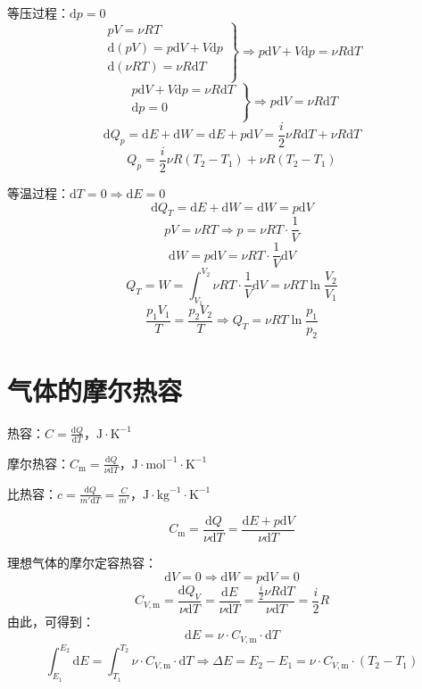 \documentclass[12pt, a4paper, twoside]{ctexbook}
\begin{document}
{\sonti 等压过程}：$\mathrm{d}p=0$
$$
\left. \begin{array}{r}
	pV=\nu RT\\
	\mathrm{d}\left( pV \right) =p\mathrm{d}V+V\mathrm{d}p\\
	\mathrm{d}\left( \nu RT \right) =\nu R\mathrm{d}T\\
\end{array} \right\} \Rightarrow p\mathrm{d}V+V\mathrm{d}p=\nu R\mathrm{d}T
$$
$$
\left. \begin{array}{r}
	p\mathrm{d}V+V\mathrm{d}p=\nu R\mathrm{d}T\\
	\mathrm{d}p=0\\
\end{array} \right\} \Rightarrow p\mathrm{d}V=\nu R\mathrm{d}T
$$
$$
\mathrm{d}Q_p=\mathrm{d}E+\mathrm{d}W=\mathrm{d}E+p\mathrm{d}V=\frac{i}{2}\nu R\mathrm{d}T + \nu R\mathrm{d}T
$$
$$
Q_p=\frac{i}{2}\nu R(T_2-T_1)+\nu R(T_2-T_1)
$$

{\sonti 等温过程}：$\mathrm{d}T=0 \Rightarrow \mathrm{d}E=0$
$$
\mathrm{d}Q_T=\mathrm{d}E+\mathrm{d}W=\mathrm{d}W=p\mathrm{d}V
$$
$$
pV=\nu RT \Rightarrow p=\nu RT\cdot \frac{1}{V}
$$
$$
\mathrm{d}W=p\mathrm{d}V=\nu RT\cdot \frac{1}{V}\mathrm{d}V
$$
$$
Q_T=W=\int_{V_1}^{V_2} \nu RT\cdot \frac{1}{V}\mathrm{d}V =\nu RT\ln \frac{V_2}{V_1}
$$
$$
\frac{p_1V_1}{T}=\frac{p_2V_2}{T} \Rightarrow Q_T=\nu RT\ln \frac{p_1}{p_2}
$$
\section{气体的摩尔热容}
{\sonti 热容}：$C=\frac{\mathrm{d}Q}{\mathrm{d}T}$，$\mathrm{J}\cdot\mathrm{K}^{-1}$

{\sonti 摩尔热容}：$C_\mathrm{m}=\frac{\mathrm{d}Q}{\nu \mathrm{d}T}$，$\mathrm{J}\cdot\mathrm{mol}^{-1}\cdot\mathrm{K}^{-1}$

{\sonti 比热容}：$c=\frac{\mathrm{d}Q}{m'\mathrm{d}T}=\frac{C}{m'}$，$\mathrm{J}\cdot\mathrm{kg}^{-1}\cdot\mathrm{K}^{-1}$

$$
C_\mathrm{m}=\frac{\mathrm{d}Q}{\nu \mathrm{d}T}=\frac{\mathrm{d}E+p\mathrm{d}V}{\nu\mathrm{d}T}
$$

{\sonti 理想气体的摩尔定容热容}：
$$
\mathrm{d}V=0 \Rightarrow \mathrm{d}W=p\mathrm{d}V=0
$$
$$
C_{V,\mathrm{m}}=\frac{\mathrm{d}Q_V}{\nu \mathrm{d}T}=\frac{\mathrm{d}E}{\nu\mathrm{d}T}=\frac{\frac{i}{2}\nu R\mathrm{d}T}{\nu\mathrm{d}T}=\frac{i}{2}R
$$
由此，可得到：
$$
\mathrm{d}E=\nu\cdot C_{V,\mathrm{m}}\cdot \mathrm{d}T
$$
$$
\int_{E_1}^{E_2}\mathrm{d}E=\int_{T_1}^{T_2}\nu\cdot C_{V,\mathrm{m}}\cdot \mathrm{d}T \Rightarrow \Delta E=E_2-E_1=\nu\cdot C_{V,\mathrm{m}}\cdot\left(T_2-T_1\right)
$$
\end{document}
